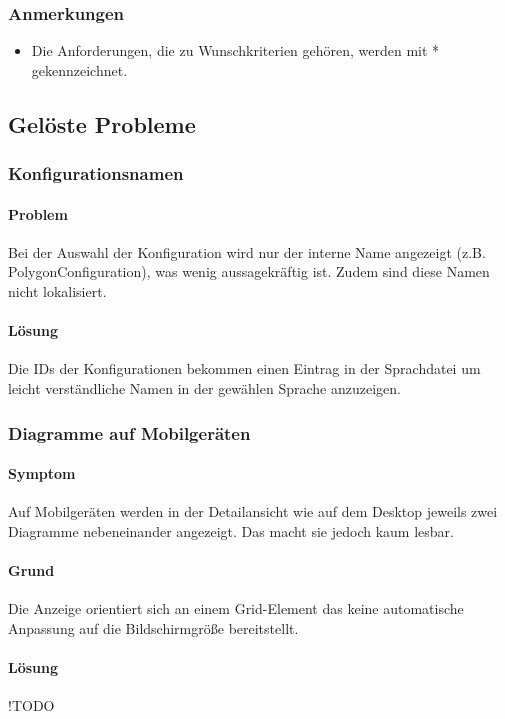 \subsubsection{Anmerkungen}

\begin{itemize}
  \item Die Anforderungen, die zu Wunschkriterien gehören, werden mit * gekennzeichnet.
\end{itemize}

\subsection{Gelöste Probleme}

\subsubsection{Konfigurationsnamen}
\paragraph{Problem}
Bei der Auswahl der Konfiguration wird nur der interne Name angezeigt (z.B. PolygonConfiguration),
was wenig aussagekräftig ist. Zudem sind diese Namen nicht lokalisiert.

\paragraph{Lösung}
Die IDs der Konfigurationen bekommen einen Eintrag in der Sprachdatei um leicht verständliche
Namen in der gewählen Sprache anzuzeigen.

\subsubsection{Diagramme auf Mobilgeräten}
\paragraph{Symptom}
Auf Mobilgeräten werden in der Detailansicht wie auf dem Desktop jeweils zwei Diagramme nebeneinander angezeigt.
Das macht sie jedoch kaum lesbar.

\paragraph{Grund}
Die Anzeige orientiert sich an einem Grid-Element das keine automatische Anpassung auf 
die Bildschirmgröße bereitstellt.

\paragraph{Lösung}
!TODO

